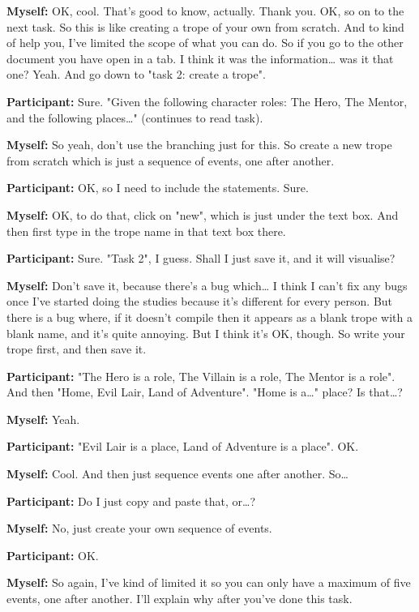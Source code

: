 \documentclass[11pt]{report}
\begin{document}
\begin{linenumbers}
\textbf{Myself:} OK, cool. That's good to know, actually. Thank you. OK, so on to the next task. So this is like creating a trope of your own from scratch. And to kind of help you, I've limited the scope of what you can do. So if you go to the other document you have open in a tab. I think it was the information\ldots{} was it that one? Yeah. And go down to "task 2: create a trope".

\textbf{Participant:} Sure. "Given the following character roles: The Hero, The Mentor, and the following places\ldots{}" (continues to read task).

\textbf{Myself:} So yeah, don't use the branching just for this. So create a new trope from scratch which is just a sequence of events, one after another.

\textbf{Participant:} OK, so I need to include the statements. Sure.

\textbf{Myself:} OK, to do that, click on "new", which is just under the text box. And then first type in the trope name in that text box there.

\textbf{Participant:} Sure. "Task 2", I guess. Shall I just save it, and it will visualise?

\textbf{Myself:} Don't save it, because there's a bug which\ldots{} I think I can't fix any bugs once I've started doing the studies because it's different for every person. But there is a bug where, if it doesn't compile then it appears as a blank trope with a blank name, and it's quite annoying. But I think it's OK, though. So write your trope first, and then save it.

\textbf{Participant:} "The Hero is a role, The Villain is a role, The Mentor is a role". And then "Home, Evil Lair, Land of Adventure". "Home is a\ldots{}" place? Is that\ldots{}?

\textbf{Myself:} Yeah.

\textbf{Participant:} "Evil Lair is a place, Land of Adventure is a place". OK.

\textbf{Myself:} Cool. And then just sequence events one after another. So\ldots{}

\textbf{Participant:} Do I just copy and paste that, or\ldots{}?

\textbf{Myself:} No, just create your own sequence of events.

\textbf{Participant:} OK.

\textbf{Myself:} So again, I've kind of limited it so you can only have a
maximum of five events, one after another. I'll explain why after you've done
this task.


\end{linenumbers}
\end{document}
